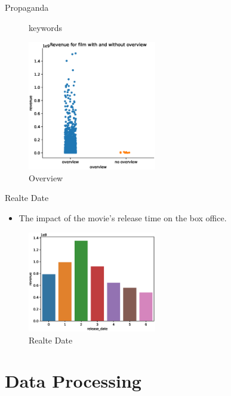 \documentclass[
 size=14pt,
 paper=smartboard,  %
 mode=present, 		%
 display=slides, 	%
 style=tuliplab,  	%
 pauseslide,
 fleqn,leqno]{powerdot}
\begin{document}
\begin{slide}[toc=,bm=]{Propaganda}
\begin{figure}[htbp]
\begin{minipage}[t]{0.48\textwidth}
      \vspace{-1.4em}
      \caption{keywords}
    \end{minipage}
    \begin{minipage}[t]{0.48\textwidth}
      \centering
      \includegraphics[width=0.5\textwidth]{figures/overview.eps}
      \vspace{-1.4em}
      \caption{Overview}
    \end{minipage}
  \end{figure}
\end{slide}


\begin{slide}[toc=,bm=]{Realte Date}
  \begin{itemize}
    \item The impact of the movie's release time on the box office.
  \end{itemize}
  \begin{figure}[htbp]
    \centering
    \includegraphics[width=0.5\textwidth]{figures//release_date.eps}
    \caption{Realte Date}
  \end{figure}
\end{slide}


\section{Data Processing}
\end{document}
